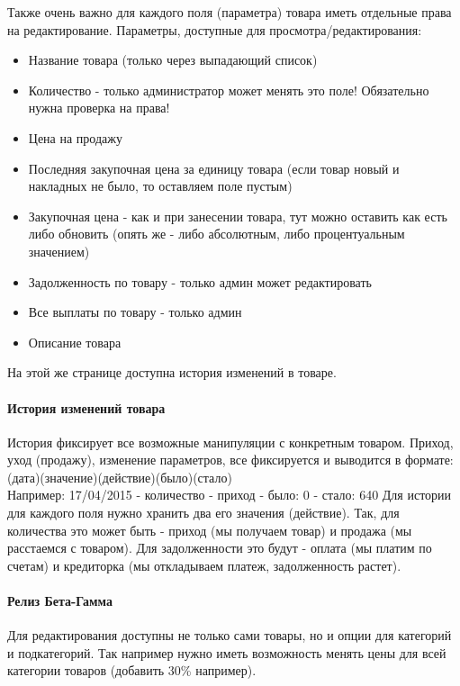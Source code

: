 \documentclass[DIV=calc, paper=a4, fontsize=11pt]{scrartcl} %
\begin{document}
Также очень важно для каждого поля (параметра) товара иметь отдельные права на редактирование. Параметры, доступные для просмотра/редактирования:
\begin{itemize}
	\item Название товара (только через выпадающий список)
	\item Количество - только администратор может менять это поле! Обязательно нужна проверка на права!
	\item Цена на продажу
	\item Последняя закупочная цена за единицу товара (если товар новый и накладных не было, то оставляем поле пустым) 
	\item Закупочная цена - как и при занесении товара, тут можно оставить как есть либо обновить (опять же - либо абсолютным, либо процентуальным значением)
	\item Задолженность по товару - только админ может редактировать
	\item Все выплаты по товару - только админ
	\item Описание товара
\end{itemize}

На этой же странице доступна история изменений в товаре.

\paragraph{История изменений товара}
История фиксирует все возможные манипуляции с конкретным товаром. Приход, уход (продажу), изменение параметров, все фиксируется и выводится в формате:
\\[0.5cm](дата)(значение)(действие)(было)(стало)
\\[0.5cm]Например: 17/04/2015 - количество - приход - было: 0 - стало: 640
Для истории для каждого поля нужно хранить два его значения (действие). Так, для количества это может быть - приход (мы получаем товар) и продажа (мы расстаемся с товаром). Для задолженности это будут - оплата (мы платим по счетам) и кредиторка (мы откладываем платеж, задолженность растет).

\paragraph{Релиз Бета-Гамма}
Для редактирования доступны не только сами товары, но и опции для категорий и подкатегорий. Так например нужно иметь возможность менять цены для всей категории товаров (добавить 30\% например). 
\end{document}
